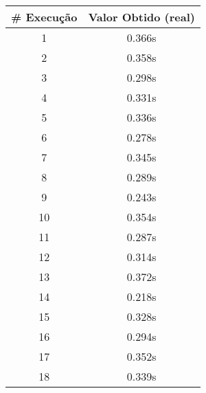 \documentclass[11pt]{article}
\begin{document}
\begin{table}[!h]
\begin{center}
\begin{minipage}{0.48\textwidth}
\begin{tabular}{| c | c |}
			\hline
				\textbf{\# Execução} &  \textbf{Valor Obtido (real)} \\ \hline
				1 & 0.366s \\ \hline
				2 & 0.358s \\ \hline
				3 & 0.298s \\ \hline
				4 & 0.331s \\ \hline
				5 & 0.336s \\ \hline
				6 & 0.278s \\ \hline
				7 & 0.345s \\ \hline
				8 & 0.289s \\ \hline
				9 & 0.243s \\ \hline
				10 & 0.354s \\ \hline
				11 & 0.287s \\ \hline
				12 & 0.314s \\ \hline
				13 & 0.372s \\ \hline
				14 & 0.218s \\ \hline
				15 & 0.328s \\ \hline
				16 & 0.294s \\ \hline
				17 & 0.352s \\ \hline
				18 & 0.339s \\ \hline
			\end{tabular}
		\end{minipage}
	\end{center}
\end{table}
\end{document}
